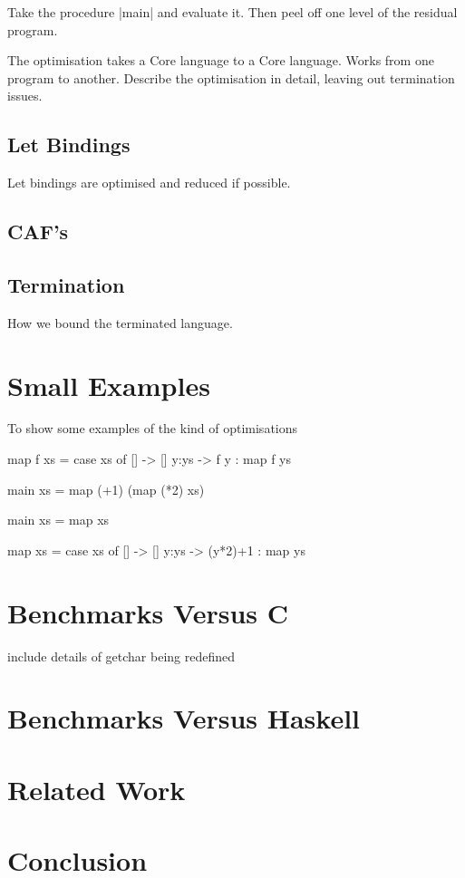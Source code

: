 \documentclass{llncs}
\begin{document}
Take the procedure |main| and evaluate it. Then peel off one level of the residual program.





The optimisation takes a Core language to a Core language. Works from one program to another. Describe the optimisation in detail, leaving out termination issues.

\subsection{Let Bindings}

Let bindings are optimised and reduced if possible.

\subsection{CAF's}
\label{sec:caf}



\subsection{Termination}

How we bound the terminated language.

\section{Small Examples}

To show some examples of the kind of optimisations 

\begin{code}
map f xs = case  xs of
                 []    -> []
                 y:ys  -> f y : map f ys

main xs = map (+1) (map (*2) xs)
\end{code}

\begin{code}
main xs = map xs

map xs = case  xs of
               []    -> []
               y:ys  -> (y*2)+1 : map ys
\end{code}






\section{Benchmarks Versus C}

include details of getchar being redefined


\section{Benchmarks Versus Haskell}

\section{Related Work}

\section{Conclusion}
\end{document}
